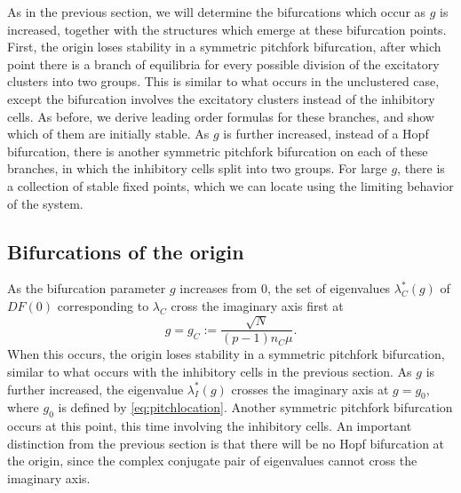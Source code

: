 \documentclass[reqno]{siamonline190516}
\begin{document}
As in the previous section, we will determine the bifurcations which occur as $g$ is increased, together with the structures which emerge at these bifurcation points. First, the origin loses stability in a symmetric pitchfork bifurcation, after which point there is a branch of equilibria for every possible division of the excitatory clusters into two groups. This is similar to what occurs in the unclustered case, except the bifurcation involves the excitatory clusters instead of the inhibitory cells. As before, we derive leading order formulas for these branches, and show which of them are initially stable. As $g$ is further increased, instead of a Hopf bifurcation, there is another symmetric pitchfork bifurcation on each of these branches, in which the inhibitory cells split into two groups. For large $g$, there is a collection of stable fixed points, which we can locate using the limiting behavior of the system.

\subsection{Bifurcations of the origin}\label{sec:Eclusterbiforigin}

As the bifurcation parameter $g$ increases from 0, the set of eigenvalues $\lambda_C^*(g)$ of $DF(0)$ corresponding to $\lambda_C$ cross the imaginary axis first at 
\begin{equation}
    g = g_C := \frac{\sqrt{N}}{(p-1) n_C \mu}.
\end{equation}
When this occurs, the origin loses stability in a symmetric pitchfork bifurcation, similar to what occurs with the inhibitory cells in the previous section. As $g$ is further increased, the eigenvalue $\lambda_I^*(g)$ crosses the imaginary axis at $g = g_0$, where $g_0$ is defined by \cref{eq:pitchlocation}. Another symmetric pitchfork bifurcation occurs at this point, this time involving the inhibitory cells. An important distinction from the previous section is that there will be no Hopf bifurcation at the origin, since the complex conjugate pair of eigenvalues cannot cross the imaginary axis.
\end{document}
